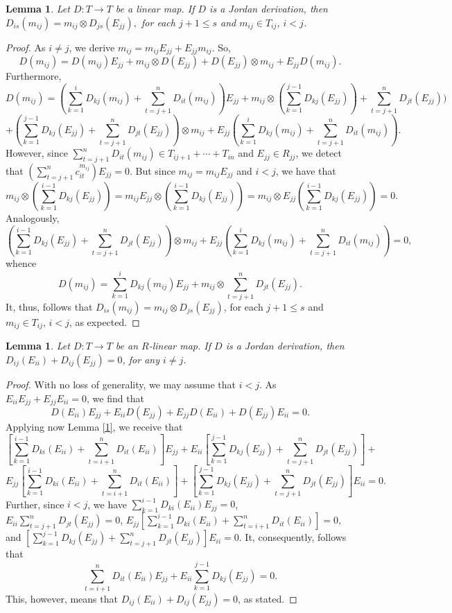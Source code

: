\documentclass[12pt, reqno]{amsart}
\newtheorem{lemma}[theorem]{Lemma}
\theoremstyle{definition}
\numberwithin{equation}{section}
\begin{document}
\begin{lemma} Let $D : T \longrightarrow T$ be a linear map. If $D$ is a Jordan derivation, then
$D_{is}(m_{ij})=m_{ij}\otimes D_{js}(E_{jj}),$ for each $j+1\leq s$ and $m_{ij}\in T_{ij}$, $i< j $.
\end{lemma}

\begin{proof} As $i\neq j$, we derive $m_{ij}=m_{ij}E_{jj}+E_{jj}m_{ij}$. So, $$D(m_{ij})=D(m_{ij})E_{jj}+m_{ij}\otimes D(E_{jj})+D(E_{jj})\otimes m_{ij}+E_{jj}D(m_{ij}).$$ Furthermore, $$D(m_{ij})=(\sum_{k=1}^{i}D_{kj}(m_{ij})+\sum_{t=j+1}^nD_{it}(m_{ij}))E_{jj}+m_{ij}\otimes (\sum_{k=1}^{j-1}D_{kj}(E_{jj}))+\sum_{t=j+1}^nD_{jt}(E_{jj}))$$$$+
(\sum_{k=1}^{j-1}D_{kj}(E_{jj})+\sum_{t=j+1}^nD_{jt}(E_{jj}))\otimes m_{ij}+E_{jj}(\sum_{k=1}^{i}D_{kj}(m_{ij})+\sum_{t=j+1}^nD_{it}(m_{ij})).$$ However, since $\sum_{t=j+1}^nD_{it}(m_{ij})\in T_{ij+1}+\cdots +T_{in}$ and $E_{jj}\in R_{jj}$, we detect that $(\sum_{t=j+1}^nc_{it}^{m_{ij}})E_{jj}=0$. But since $m_{ij}=m_{ij}E_{jj}$ and $i< j$, we have that $$m_{ij}\otimes (\sum_{k=1}^{i-1}D_{kj}(E_{jj}))=m_{ij}E_{jj}\otimes (\sum_{k=1}^{i-1}D_{kj}(E_{jj}))=m_{ij}\otimes E_{jj}(\sum_{k=1}^{i-1}D_{kj}(E_{jj}))=0.$$ Analogously, $$(\sum_{k=1}^{i-1}D_{kj}(E_{jj})+\sum_{t=j+1}^nD_{jt}(E_{jj}))\otimes m_{ij}+E_{jj}(\sum_{k=1}^{i}D_{kj}(m_{ij})+\sum_{t=j+1}^nD_{it}(m_{ij}))=0,$$ whence $$D(m_{ij})=\sum_{k=1}^{i}D_{kj}(m_{ij})E_{jj}+m_{ij}\otimes \sum_{t=j+1}^nD_{jt}(E_{jj}).$$ It, thus, follows that $D_{is}(m_{ij})=m_{ij}\otimes D_{js}(E_{jj})$, for each $j+1\leq s$ and $m_{ij}\in T_{ij}$, $i< j$, as expected.
\end{proof}

\begin{lemma} Let $D : T \longrightarrow T$ be an $R$-linear map. If $D$ is a Jordan derivation, then $D_{ij}(E_{ii})+D_{ij}(E_{jj})=0$, for any $i\neq j$.
\end{lemma}

\begin{proof} With no loss of generality, we may assume that $i< j$. As $E_{ii}E_{jj}+E_{jj}E_{ii}=0$, we find that $$D(E_{ii})E_{jj}+E_{ii}D(E_{jj})+E_{jj}D(E_{ii})+D(E_{jj})E_{ii}=0.$$ Applying now Lemma \ref{1}, we receive that $$[\sum_{k=1}^{i-1}D_{ki}(E_{ii})+\sum_{t=i+1}^nD_{it}(E_{ii})]E_{jj}+E_{ii}[\sum_{k=1}^{j-1}D_{kj}(E_{jj})+\sum_{t=j+1}^nD_{jt}(E_{jj})]+$$$$E_{jj}[\sum_{k=1}^{i-1}D_{ki}(E_{ii})+
\sum_{t=i+1}^nD_{it}(E_{ii})]+[\sum_{k=1}^{j-1}D_{kj}(E_{jj})+\sum_{t=j+1}^nD_{jt}(E_{jj})]E_{ii}=0.$$ Further, since $i< j$, we have $\sum_{k=1}^{i-1}D_{ki}(E_{ii})E_{jj}=0$, $E_{ii}\sum_{t=j+1}^nD_{jt}(E_{jj})=0$, $E_{jj}[\sum_{k=1}^{i-1}D_{ki}(E_{ii})+\sum_{t=i+1}^nD_{it}(E_{ii})]=0$, and $[\sum_{k=1}^{j-1}D_{kj}(E_{jj})+\sum_{t=j+1}^nD_{jt}(E_{jj})]E_{ii}=0$. It, consequently, follows that $$\sum_{t=i+1}^nD_{it}(E_{ii})E_{jj}+E_{ii} \sum_{k=1}^{j-1}D_{kj}(E_{jj})=0.$$ This, however, means that $D_{ij}(E_{ii})+D_{ij}(E_{jj})=0$, as stated.
\end{proof}
\end{document}
